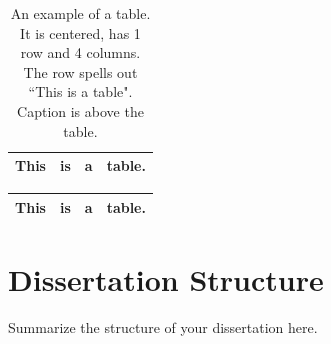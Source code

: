 \begin{table}[hbtp]
	\centering
	\caption[This is a very simple table.]{An example of a table.  It is centered, has 1 row and 4 columns.  The row spells out ``This is a table".  Caption is above the table.}
	\begin{tabular}{|c|c|c|c|}
	\hline
	This & is & a & table.\\
	\hline
	\end{tabular}
	\label{tab:tab1}
\end{table}

\begin{table}[hbtp]
	\centering
	\caption[This is a table using the longtable package.]{An example of a long table.  It is centered, has 1 row and 4 columns.  The row spells out ``This is a table".  Caption is above the table.}
	\begin{longtable}{|c|c|c|c|}
	\hline
	This & is & a & table.\\
	\hline
	\end{longtable}
	\label{tab:tab2}
\end{table}


\section{Dissertation Structure}
\label{sec:struture}

Summarize the structure of your dissertation here.
